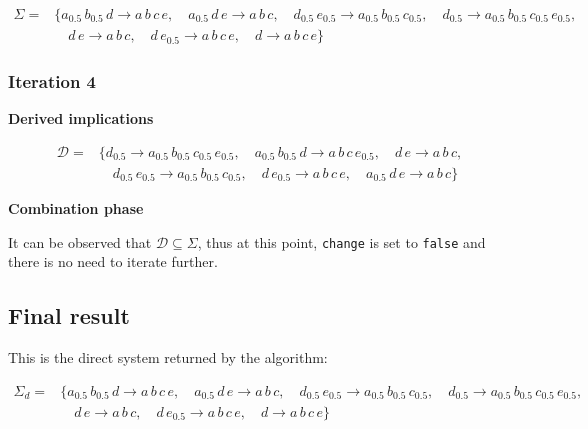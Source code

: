\documentclass[
  letterpaper,
  DIV=11,
  numbers=noendperiod]{scrartcl}
\begin{document}
\begin{align*}
\Sigma = & \big\{
a_{0.5}\,b_{0.5}\,d \to a\,b\,c\,e,\quad 
a_{0.5}\,d\,e \to a\,b\,c,\quad 
d_{0.5}\,e_{0.5} \to a_{0.5}\,b_{0.5}\,c_{0.5},\quad 
d_{0.5} \to a_{0.5}\,b_{0.5}\,c_{0.5}\,e_{0.5},\\
&\quad 
d\,e \to a\,b\,c,\quad 
d\,e_{0.5} \to a\,b\,c\,e,\quad 
d \to a\,b\,c\,e\big\}
\end{align*}

\subsubsection{Iteration 4}\label{iteration-4}

\textbf{Derived implications}

\begin{align*}
\mathcal D = & \big\{
d_{0.5} \to a_{0.5}\,b_{0.5}\,c_{0.5}\,e_{0.5},\quad 
a_{0.5}\,b_{0.5}\,d \to a\,b\,c\,e_{0.5},\quad 
d\,e \to a\,b\,c,\\
&\quad 
d_{0.5}\,e_{0.5} \to a_{0.5}\,b_{0.5}\,c_{0.5},\quad 
d\,e_{0.5} \to a\,b\,c\,e,\quad 
a_{0.5}\,d\,e \to a\,b\,c\big\}
\end{align*}

\textbf{Combination phase}

It can be observed that \(\mathcal D \subseteq \Sigma\), thus at this
point, \texttt{change} is set to \texttt{false} and there is no need to
iterate further.

\subsection{Final result}\label{final-result}

This is the direct system returned by the algorithm:

\begin{align*}
\Sigma_d = & \big\{
a_{0.5}\,b_{0.5}\,d \to a\,b\,c\,e,\quad 
a_{0.5}\,d\,e \to a\,b\,c,\quad 
d_{0.5}\,e_{0.5} \to a_{0.5}\,b_{0.5}\,c_{0.5},\quad 
d_{0.5} \to a_{0.5}\,b_{0.5}\,c_{0.5}\,e_{0.5},\\
&\quad 
d\,e \to a\,b\,c,\quad 
d\,e_{0.5} \to a\,b\,c\,e,\quad 
d \to a\,b\,c\,e\big\}
\end{align*}
\end{document}
